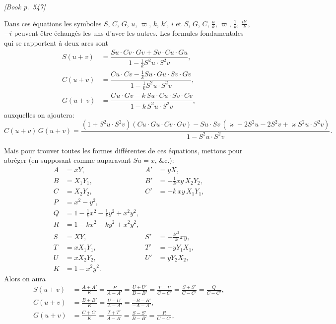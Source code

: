 \documentclass[11pt]{article}
\begin{document}
\medskip
\noindent\textit{[Book p.~547]}\hfill

\smallskip

\noindent Dans ces \'equations les symboles $S$, $C$, $G$, $u$, $\varpi$, $k$, $k'$, $i$ et $S$, $G$, $C$, $\tfrac{u}{k}$, $\varpi$, $\tfrac{1}{k}$, $\tfrac{ik'}{k}$, $-i$ peuvent \^etre \'echang\'es les uns d'avec les autres. Les formules fondamentales qui se rapportent \`a deux arcs sont
\[
\begin{aligned}
S(u + v) &= \dfrac{Su\cdot Cv\cdot Gv + Sv\cdot Cu\cdot Gu}{1 - \tfrac{1}{k}S^{2}u\cdot S^{2}v},\\[4pt]
C(u + v) &= \dfrac{Cu\cdot Cv - \tfrac{1}{k}Su\cdot Gu\cdot Sv\cdot Gv}{1 - \tfrac{1}{k}S^{2}u\cdot S^{2}v},\\[4pt]
G(u + v) &= \dfrac{Gu\cdot Gv - k\,Su\cdot Cu\cdot Sv\cdot Cv}{1 - k\,S^{2}u\cdot S^{2}v},
\end{aligned}
\]
auxquelles on ajoutera:
\[
C(u + v)\,G(u + v) = \dfrac{(1 + S^{2}u\cdot S^{2}v)(Cu\cdot Gu\cdot Cv\cdot Gv) - Su\cdot Sv\,(\varkappa - 2 S^{2}u - 2 S^{2}v + \varkappa S^{2}u\cdot S^{2}v)}{1 - S^{2}u\cdot S^{2}v}.
\]

Mais pour trouver toutes les formes diff\'erentes de ces \'equations, mettons pour abr\'eger (en supposant comme auparavant $Su = x$, \&c.):
\[
\begin{aligned}
A &= xY,\quad & A' &= yX,\\
B &= X_{1}Y_{1},\quad & B' &= -\tfrac{1}{k}xy\,X_{2}Y_{2},\\
C &= X_{2}Y_{2},\quad & C' &= -k\,xy\,X_{1}Y_{1},\\
P &= x^{2} - y^{2},\\
Q &= 1 - \tfrac{1}{k}x^{2} - \tfrac{1}{k}y^{2} + x^{2}y^{2},\\
R &= 1 - kx^{2} - ky^{2} + x^{2}y^{2},\\
S &= XY,\quad & S' &= -\tfrac{k'^{2}}{k}xy,\\
T &= xX_{1}Y_{1},\quad & T' &= -yY_{1}X_{1},\\
U &= xX_{2}Y_{2},\quad & U' &= yY_{2}X_{2},\\
K &= 1 - x^{2}y^{2}.
\end{aligned}
\]
Alors on aura
\[
\begin{aligned}
S(u + v) &= \frac{A + A'}{K} = \frac{P}{A - A'} = \frac{U + U'}{B - B'} = \frac{T - T'}{C - C'} = \frac{S + S'}{C - C'} = \frac{Q}{C - C'},\\[4pt]
C(u + v) &= \frac{B + B'}{K} = \frac{U - U'}{A - A'} = \frac{-B - B'}{-A - A'},\\[4pt]
G(u + v) &= \frac{C + C'}{K} = \frac{T + T'}{A - A'} = \frac{S - S'}{B - B'} = \frac{R}{C - C'},
\end{aligned}
\]
\end{document}
